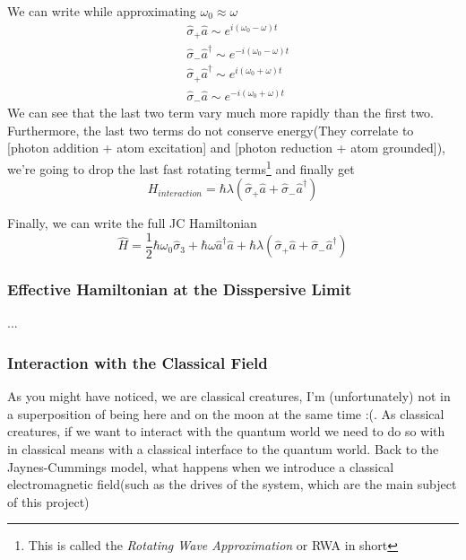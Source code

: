 \documentclass[english, a4paper, 12pt, twoside]{article}
\numberwithin{equation}{section} %
\begin{document}
We can write while approximating $\omega_0 \approx \omega$
\begin{equation}
    \begin{split}
        &\hat{\sigma}_+\hat{a} \sim e^{i(\omega_0 - \omega)t}\\
        &\hat{\sigma}_-\hat{a}^\dag \sim e^{-i(\omega_0 - \omega)t}\\
        &\hat{\sigma}_+\hat{a}^\dag \sim e^{i(\omega_0 + \omega)t}\\
        &\hat{\sigma}_-\hat{a} \sim e^{-i(\omega_0 + \omega)t}
    \end{split}
\end{equation}
We can see that the last two term vary much more rapidly than the first two. Furthermore, the last two terms do not conserve energy(They correlate to [photon addition + atom excitation] and [photon reduction + atom grounded]), we're going to drop the last fast rotating terms\footnote{This is called the \textit{Rotating Wave Approximation} or RWA in short} and finally get
\begin{equation}
    \boxed{H_{interaction} = \hbar\lambda(\hat{\sigma}_+\hat{a} + \hat{\sigma}_-\hat{a}^\dag)}
\end{equation}

\par

Finally, we can write the full JC Hamiltonian
\begin{equation}
    \boxed{\hat{H} = \frac{1}{2}\hbar \omega_0\hat{\sigma}_3 
                     + \hbar \omega \hat{a}^\dag \hat{a} 
                     +  \hbar\lambda(\hat{\sigma}_+\hat{a} + \hat{\sigma}_-\hat{a}^\dag)}
\end{equation}

\subsubsection{Effective Hamiltonian at the Disspersive Limit}
...

\subsubsection{Interaction with the Classical Field} \label{sec:interaction-with_classical-field}
As you might have noticed, we are classical creatures, I'm (unfortunately) not in a superposition of being here and on the moon at the same time :(. As classical creatures, if we want to interact with the quantum world we need to do so with in classical means with a classical interface to the quantum world. Back to the Jaynes-Cummings model, what happens when we introduce a classical electromagnetic field(such as the drives of the system, which are the main subject of this project)
\end{document}
